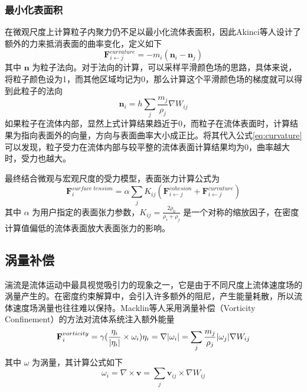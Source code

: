 \subsubsection{最小化表面积}
    在微观尺度上计算粒子内聚力仍不足以最小化流体表面积，因此Akinci等人设计了额外的力来抵消表面的曲率变化，定义如下
    \begin{equation}\label{eq:curvature}
    	\mathbf F_{i \leftarrow j} ^{curvature} =
    	- m_i (\mathbf n_i - \mathbf n_j)
    \end{equation}
    其中 $\mathbf n$ 为粒子法向。对于法向的计算，可以采样平滑颜色场的思路，具体来说，将粒子颜色设为1，而其他区域均记为0，那么计算这个平滑颜色场的梯度就可以得到此粒子的法向
    \begin{equation}
    	\mathbf n_i = h \sum_j \frac {m_j} {\rho_j} \nabla W_{ij}
    \end{equation}
    如果粒子在流体内部，显然上式计算结果趋近于0，而粒子在流体表面时，计算结果为指向表面外的向量，方向与表面曲率大小成正比。将其代入公式\ref{eq:curvature}可以发现，粒子受力在流体内部与较平整的流体表面计算结果均为0，曲率越大时，受力也越大。
    
    最终结合微观与宏观尺度的受力模型，表面张力计算公式为
    \begin{equation}
    	\mathbf F_{i} ^{surface\;tension} =
    	\alpha \sum_j K_{ij} (\mathbf F_{i \leftarrow j} ^{cohesion} + \mathbf F_{i \leftarrow j} ^{curvature})
    \end{equation}
    其中 $\alpha$ 为用户指定的表面张力参数，$K_{ij} = \frac {2\rho_0} {\rho_i + \rho_j}$ 是一个对称的缩放因子，在密度计算值偏低的流体表面放大表面张力的影响。

\subsection{涡量补偿}
    湍流是流体运动中最具视觉吸引力的现象之一，它是由于不同尺度上流体速度场的涡量产生的。在密度约束解算中，会引入许多额外的阻尼，产生能量耗散，所以流体速度场涡量也往往难以保持。Macklin等人\cite{MM13PBF}采用涡量补偿（Vorticity Confinement）的方法对流体系统注入额外能量
    \begin{equation}
    	\mathbf F_i ^{vorticity} =
    	\gamma (\frac{\eta_i}{|\eta_i|} \times \omega_i) \\
    	\eta_i = \nabla |\omega_i| = \sum_j \frac {m_j} {\rho_j} |\omega_j| \nabla W_{ij}
    \end{equation}
    其中 $\omega$ 为涡量，其计算公式如下
    \begin{equation}
    	\omega_i = \nabla \times \mathbf v =
    	\sum_j \mathbf v_{ij} \times \nabla W_{ij}
    \end{equation}
    
